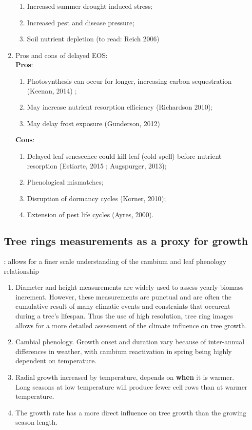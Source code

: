 \documentclass{article}
\begin{document}
\begin{enumerate}
\begin {enumerate}
		\item Increased summer drought induced stress;
		\item Increased pest and disease pressure;
		\item Soil nutrient depletion (to read: Reich 2006)
	\end {enumerate}
\item Pros and cons of delayed EOS: \\
\textbf{Pros}: 
	\begin {enumerate}
		\item Photosynthesis can occur for longer, increasing carbon sequestration (Keenan, 2014) ; 
		\item May increase nutrient resorption efficiency (Richardson 2010); 
		\item May delay frost exposure (Gunderson, 2012)
	\end {enumerate}
\textbf{Cons}: 
	\begin {enumerate}
		\item Delayed leaf senescence could kill leaf (cold spell) before nutrient resorption (Estiarte, 2015 ; Augspurger, 2013); 
		\item Phenological mismatches; 
		\item Disruption of dormancy cycles (Korner, 2010); 
		\item Extension of pest life cycles (Ayres, 2000).
	\end {enumerate}
\end{enumerate}

\subsection *{Tree rings measurements as a proxy for growth}:  allows for a finer scale understanding of the cambium and leaf phenology relationship
\begin{enumerate}
	\item  Diameter and height measurements are widely used to assess yearly biomass increment. However, these measurements are punctual and are often the cumulative result of many climatic events and constraints that occurent during a tree's lifespan. Thus the use of high resolution, tree ring images allows for a more detailed assessment of the climate influence on tree growth.
	\item Cambial phenology. Growth onset and duration vary because of inter-annual differences in weather, with cambium reactivation in spring being highly dependent on temperature. 
	\item Radial growth increased by temperature, depends on \textbf{when} it is warmer. Long seasons at low temperature will produce fewer cell rows than at warmer temperature. 
	\item The growth rate has a more direct influence on tree growth than the growing season length. 
\end{enumerate}
\end{document}
